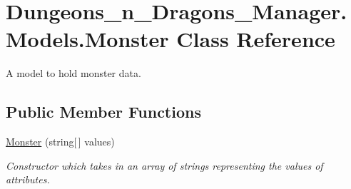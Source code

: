 \hypertarget{class_dungeons__n___dragons___manager_1_1_models_1_1_monster}{}\section{Dungeons\+\_\+n\+\_\+\+Dragons\+\_\+\+Manager.\+Models.\+Monster Class Reference}
\label{class_dungeons__n___dragons___manager_1_1_models_1_1_monster}


A model to hold monster data.  


\subsection*{Public Member Functions}
\begin{DoxyCompactItemize}
\item 
\mbox{\hyperlink{class_dungeons__n___dragons___manager_1_1_models_1_1_monster_a104c2ce5cf5652cfbdc7fe2f5be0082e}{Monster}} (string\mbox{[}$\,$\mbox{]} values)
\begin{DoxyCompactList}\small\item\em Constructor which takes in an array of strings representing the values of attributes. \end{DoxyCompactList}\end{DoxyCompactItemize}
